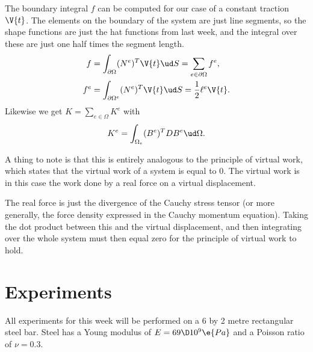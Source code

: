 \documentclass[sigconf]{acmart}
\begin{document}
The boundary integral $ f $ can be computed for our case of a constant traction $ \V{t} $. The elements on the boundary of the system are just line segments, so the shape functions are just the hat functions from last week, and the integral over these are just one half times the segment length.
\begin{align}
	f &= \int_{\partial\Omega} (N^e)^T \V{t} \ud S = \sum_{e \in \partial \Omega} f^e, \nonumber \\
	f^e &= \int_{\partial \Omega^e} (N^e)^T \V{t} \ud S = \frac{1}{2} \ell^e \V{t}. \label{eq:boundary_elem} 
\end{align}
Likewise we get $ K = \sum_{e\in \Omega}K^e $ with 
\begin{equation*}
	K^e = \int_{\Omega_e}(B^e)^T D B^e \ud \Omega.
\end{equation*}

A thing to note is that this is entirely analogous to the principle of virtual work, which states that the virtual work of a system is equal to 0. The virtual work is in this case the work done by a real force on a virtual displacement.

The real force is just the divergence of the Cauchy stress tensor (or more generally, the force density expressed in the Cauchy momentum equation). Taking the dot product between this and the virtual displacement, and then integrating over the whole system must then equal zero for the principle of virtual work to hold.


\section{Experiments}
All experiments for this week will be performed on a 6 by 2 metre rectangular steel bar. Steel has a Young modulus of $ E = 69\D 10^9 \e{Pa} $ and a Poisson ratio of $ \nu = 0.3 $. 
\end{document}
